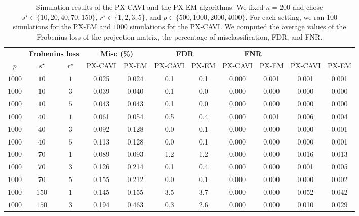 \documentclass[pdftex, noinfoline, letter]{imsart}
\theoremstyle{plain}
\begin{document}
\begin{table}[h!]
\begin{adjustwidth}{-.9in}{-.9in}  
\centering
\caption{\small Simulation results of the PX-CAVI and the PX-EM algorithms. We fixed $n = 200$ and chose $s^\star \in \{10, 20, 40, 70, 150\}$, $r^\star \in \{1, 2, 3, 5\}$, and $p \in \{500, 1000, 2000, 4000\}$. For each setting, we ran $100$ simulations for the PX-EM and $1000$ simulations for the PX-CAVI. We computed the average values of the Frobenius loss of the projection matrix, the percentage of misclassification, FDR, and FNR.}
\label{sim-2}
{ 
\small
\begin{tabular}{ccc|cc|cc|cc|cc}
\Xhline{2\arrayrulewidth}
\multicolumn{3}{c}{} & \multicolumn{2}{c}{\bf Frobenius loss} & \multicolumn{2}{c}{\bf Misc (\%)}
& \multicolumn{2}{c}{\bf FDR} & \multicolumn{2}{c}{\bf FNR}
\\\Xhline{2\arrayrulewidth}
    $p$ & $s^\star$ & $r^\star$ &  PX-CAVI & PX-EM
    &  PX-CAVI & PX-EM &  PX-CAVI & PX-EM &  PX-CAVI & PX-EM\\
\hline
    $1000$ & $10$ & $1$  &
    0.025 & 0.024 &
    0.1 &  0.1 &
    0.000 & 0.001 & 0.001 & 0.001\\
    $1000$ & $10$ & $3$ &
    0.039 & 0.040  &
    0.1 &  0.0 &
    0.000 & 0.000 & 0.000 & 0.000\\
    $1000$ & $10$ & $5$ &
    0.043 & 0.043 &
    0.1 & 0.0 
    & 0.000 & 0.000 & 0.000 & 0.000\\ 
    \hline
    $1000$ & $40$ & $1$  &
    0.061  & 0.054  &
    0.5 & 0.4  &
    0.000 & 0.001 & 0.006 & 0.004\\
    $1000$ & $40$ & $3$ &
    0.092 & 0.128 &
    0.0 &  0.1
    & 0.000 & 0.000 & 0.000 & 0.001\\
    $1000$ & $40$ & $5$ &
    0.113 & 0.128 &
    0.0 &  0.1 & 
    0.000 & 0.000 & 0.000 & 0.001\\
    \hline
    $1000$ & $70$ & $1$  &
    0.089 & 0.093  &
    1.2 & 1.2 &
    0.000 & 0.000 & 0.016 & 0.013\\
    $1000$ & $70$ & $3$ &
    0.126 & 0.214  &
    0.1 &  0.4  &
    0.000 & 0.000 & 0.001 & 0.005\\
    $1000$ & $70$ & $5$ &
    0.155 & 0.212 &
    0.0 &  0.1 
    &0.000 & 0.000 & 0.000 & 0.002\\   
    \hline
    $1000$ & $150$ & $1$  &
    0.145 & 0.155 &
    3.5 &  3.7
    & 0.000  & 0.000 & 0.052 & 0.042\\
    $1000$ & $150$ & $3$ &
    0.194 & 0.463 &
    0.3 &  2.6 
    & 0.000 & 0.000 & 0.010 & 0.029\\

\end{tabular}}
\end{adjustwidth}
\end{table}
\end{document}
